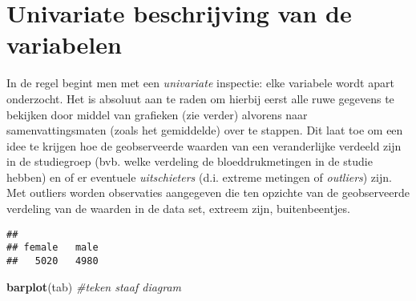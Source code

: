 \documentclass[12pt,dutch,coursenotes]{book}
\newenvironment{Shaded}{\begin{snugshade}}{\end{snugshade}}
\newcommand{\KeywordTok}[1]{\textcolor[rgb]{0.13,0.29,0.53}{\textbf{#1}}}
\newcommand{\StringTok}[1]{\textcolor[rgb]{0.31,0.60,0.02}{#1}}
\newcommand{\CommentTok}[1]{\textcolor[rgb]{0.56,0.35,0.01}{\textit{#1}}}
\newcommand{\OperatorTok}[1]{\textcolor[rgb]{0.81,0.36,0.00}{\textbf{#1}}}
\newcommand{\NormalTok}[1]{#1}
\theoremstyle{definition}
\theoremstyle{definition}
\theoremstyle{definition}
\theoremstyle{remark}
\begin{document}
\section{Univariate beschrijving van de variabelen}\label{sec:univar}

In de regel begint men met een \emph{univariate} inspectie: elke
variabele wordt apart onderzocht. Het is absoluut aan te raden om
hierbij eerst alle ruwe gegevens te bekijken door middel van grafieken
(zie verder) alvorens naar samenvattingsmaten (zoals het gemiddelde)
over te stappen. Dit laat toe om een idee te krijgen hoe de
geobserveerde waarden van een veranderlijke verdeeld zijn in de
studiegroep (bvb. welke verdeling de bloeddrukmetingen in de studie
hebben) en of er eventuele \emph{uitschieters} (d.i. extreme metingen of
\emph{outliers}) zijn. Met outliers worden observaties aangegeven die
ten opzichte van de geobserveerde verdeling van de waarden in de data
set, extreem zijn, buitenbeentjes.

\begin{Shaded}
\end{Shaded}

\begin{verbatim}
## 
## female   male 
##   5020   4980
\end{verbatim}

\begin{Shaded}
\begin{Highlighting}[]
\KeywordTok{barplot}\NormalTok{(tab)  }\CommentTok{#teken staaf diagram}
\end{Highlighting}
\end{Shaded}
\end{document}
